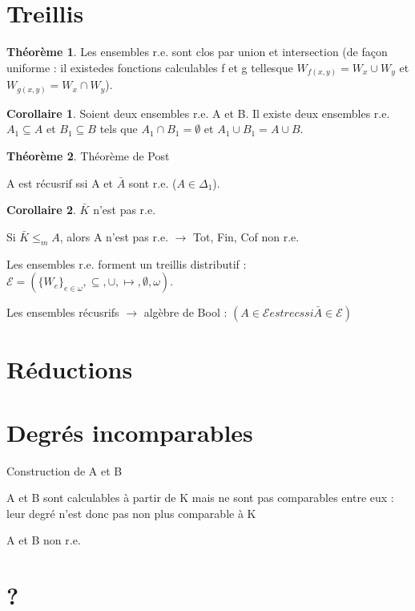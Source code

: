 \documentclass{book}
\theoremstyle{definition}
\newtheorem{theorem}{Théorème}
\newtheorem{corollary}{Corollaire}
\numberwithin{lemma}{subsection}
\numberwithin{theorem}{subsection}
\numberwithin{definition}{subsection}
\numberwithin{proposition}{subsection}
\numberwithin{corollary}{subsection}
\numberwithin{property}{subsection}
\numberwithin{example}{subsection}
\numberwithin{heuristique}{subsection}
\numberwithin{scenario}{subsection}
\begin{document}
\section{Treillis}

\begin{theorem}
Les ensembles r.e. sont clos par union et intersection (de façon uniforme : il existedes fonctions calculables f et g tellesque $W_{f(x,y)} = W_x \cup W_y$ et $W_{g(x,y)} = W_x \cap W_y$).
\end{theorem}
\begin{corollary}
Soient deux ensembles r.e. A et B. Il existe deux ensembles r.e. $A_1 \subseteq A$ et $B_1 \subseteq B$ tels que $A_1 \cap B_1 = \emptyset$ et $A_1 \cup B_1 = A \cup B$.
\end{corollary}
\begin{theorem}
Théorème de Post
\par A est récusrif ssi A et $\bar{A}$ sont r.e. ($A \in \Delta_1$).
\end{theorem}
\begin{corollary}
$\bar{K}$ n'est pas r.e.
\end{corollary}
\par Si $\bar{K} \leqslant_m A$, alors A n'est pas r.e. $\rightarrow$ Tot, Fin, Cof non r.e.
\par Les ensembles r.e. forment un treillis distributif : $\mathcal{E} = (\{W_e\}_{e\in\omega},\subseteq,\cup,\mapsto,\emptyset,\omega)$.
\par Les ensembles récusrifs $\rightarrow$ algèbre de Bool : $(A \in \mathcal{E} est rec ssi \bar{A}\in\mathcal{E})$


\section{Réductions}

\section{Degrés incomparables}

\par Construction de A et B
\par A et B sont calculables à partir de K mais ne sont pas comparables entre eux : leur degré n'est donc pas non plus comparable à K
\par A et B non r.e.

\section{?}
\end{document}
